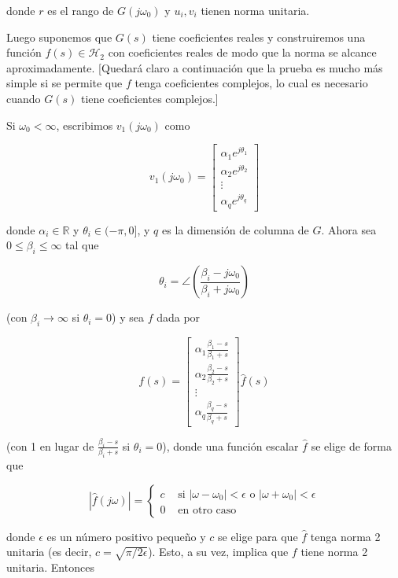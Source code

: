 donde $r$ es el rango de $G\left(j \omega_{0}\right)$ y $u_{i}, v_{i}$ tienen norma unitaria.

Luego suponemos que $G(s)$ tiene coeficientes reales y construiremos una función $f(s) \in \mathcal{H}_{2}$ con coeficientes reales de modo que la norma se alcance aproximadamente. [Quedará claro a continuación que la prueba es mucho más simple si se permite que $f$ tenga coeficientes complejos, lo cual es necesario cuando $G(s)$ tiene coeficientes complejos.]

Si $\omega_{0}<\infty$, escribimos $v_{1}\left(j \omega_{0}\right)$ como

$$
v_{1}\left(j \omega_{0}\right)=\left[\begin{array}{c}
\alpha_{1} e^{j \theta_{1}} \\
\alpha_{2} e^{j \theta_{2}} \\
\vdots \\
\alpha_{q} e^{j \theta_{q}}
\end{array}\right]
$$

donde $\alpha_{i} \in \mathbb{R}$ y $\theta_{i} \in(-\pi, 0]$, y $q$ es la dimensión de columna de $G$. Ahora sea $0 \leq \beta_{i} \leq \infty$ tal que

$$
\theta_{i}=\angle\left(\frac{\beta_{i}-j \omega_{0}}{\beta_{i}+j \omega_{0}}\right)
$$

(con $\beta_{i} \rightarrow \infty$ si $\theta_{i}=0$) y sea $f$ dada por

$$
f(s)=\left[\begin{array}{c}
\alpha_{1} \frac{\beta_{1}-s}{\beta_{1}+s} \\
\alpha_{2} \frac{\beta_{2}-s}{\beta_{2}+s} \\
\vdots \\
\alpha_{q} \frac{\beta_{q}-s}{\beta_{q}+s}
\end{array}\right] \hat{f}(s)
$$

(con 1 en lugar de $\frac{\beta_{i}-s}{\beta_{i}+s}$ si $\theta_{i}=0$), donde una función escalar $\hat{f}$ se elige de forma que

$$
|\hat{f}(j \omega)|= \begin{cases}c & \text { si }\left|\omega-\omega_{0}\right|<\epsilon \text { o }\left|\omega+\omega_{0}\right|<\epsilon \\
0 & \text { en otro caso }\end{cases}
$$

donde $\epsilon$ es un número positivo pequeño y $c$ se elige para que $\hat{f}$ tenga norma 2 unitaria (es decir, $c=\sqrt{\pi / 2 \epsilon}$). Esto, a su vez, implica que $f$ tiene norma 2 unitaria. Entonces

